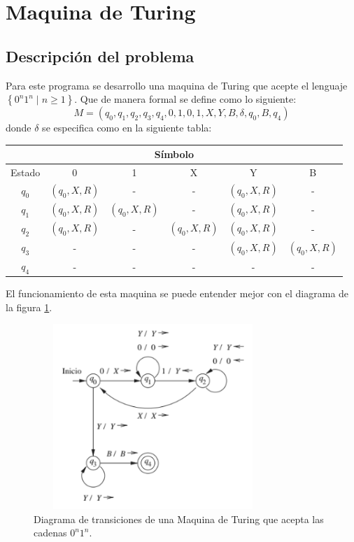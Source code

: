\section{Maquina de Turing}
	\subsection{Descripción del problema}
	Para este programa se desarrollo una maquina de Turing que acepte el lenguaje $ \left\lbrace 0^{n}1^{n} \mid n\geq 1\right\rbrace  $. Que de manera formal se define como lo siguiente:
	\[ M= ({q_{0}, q_{1}, q_{2}, q_{3}}, q_{4}, {0, 1}, {0, 1, X, Y, B}, \delta, q_{0}, B, {q_{4}}) \]
	donde $\delta$ se especifica como en la siguiente tabla:
	\\
	\begin{center}
		\begin{tabular}{|c|c|c|c|c|c|}
			\hline 
			\multicolumn{6}{|c|}{Símbolo} \\ 
			\hline 
			Estado & 0 & 1 & X & Y & B \\ 
			\hline 
			$q_{0}$ & $(q_{0}, X, R)$ & - & - & $(q_{0}, X, R)$ & - \\ 
			\hline 
			$q_{1}$ & $(q_{0}, X, R)$ & $(q_{0}, X, R)$ & - & $(q_{0}, X, R)$ & - \\ 
			\hline 
			$q_{2}$ & $(q_{0}, X, R)$ & - & $(q_{0}, X, R)$ & $(q_{0}, X, R)$ & - \\ 
			\hline 
			$q_{3}$ & - & - & - & $(q_{0}, X, R)$ & $(q_{0}, X, R)$ \\ 
			\hline 
			$q_{4}$ & - & - & - & - & - \\ 
			\hline 
		\end{tabular}
	\end{center}
	El funcionamiento de esta maquina se puede entender mejor con el diagrama de la figura \ref{fig:turing-diagrama}.
	\begin{figure}[H]
		\begin{center}
			\includegraphics[width=9cm, height=7cm]{img/maquina-diagrama.png}
			\caption{Diagrama de transiciones de una Maquina de Turing que acepta las cadenas $0^{n}1^{n}$. \cite{LIBRO}}
			\label{fig:turing-diagrama}
		\end{center}
	\end{figure}
